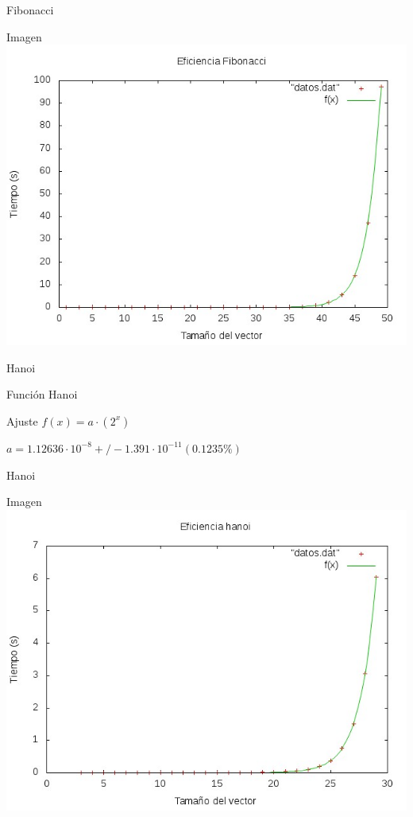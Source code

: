 \documentclass[compress]{beamer}
\begin{document}
\begin{frame}{Fibonacci}
	\begin{alertblock}{Imagen}
	\includegraphics[scale=0.55]{../Graficas/Fibonacci/fibonacciO0_ruben.jpeg}
	\end{alertblock}
\end{frame}



\begin{frame}{Hanoi}
	\begin{block}{Función}
		Hanoi
	\end{block}
	
	\begin{block}{Ajuste}
	$f(x) = a\cdot(2^x) $
	
	$a               = 1.12636\cdot 10^{-8}      +/- 1.391\cdot 10^{-11}    (0.1235\%)$
	\end{block}
\end{frame}

\begin{frame}{Hanoi}
	\begin{alertblock}{Imagen}
	\includegraphics[scale=0.55]{../Graficas/Hanoi/hanoiO0_ruben.jpeg}
	\end{alertblock}
\end{frame}
\end{document}
